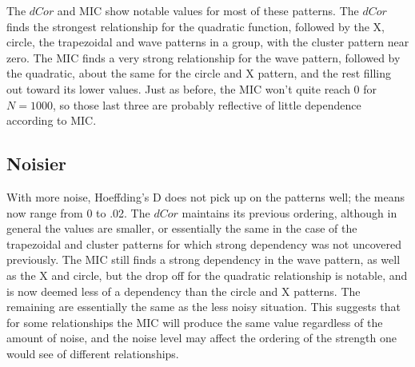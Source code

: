 \documentclass[english,nohyper,titlepage]{tufte-handout}\usepackage{graphicx, color}
\begin{document}
The $dCor$ and MIC show notable values for most of these patterns.  The $dCor$ finds the strongest relationship for the quadratic function, followed by the X, circle, the trapezoidal and wave patterns in a group, with the cluster pattern near zero. The MIC finds a very strong relationship for the wave pattern, followed by the quadratic, about the same for the circle and X pattern, and the rest filling out toward its lower values.  Just as before, the MIC won't quite reach 0 for $N = 1000$, so those last three are probably reflective of little dependence according to MIC.


\subsection{Noisier}
With more noise, Hoeffding's D does not pick up on the patterns well; the means now range from 0 to .02. The $dCor$ maintains its previous ordering, although in general the values are smaller, or essentially the same in the case of the trapezoidal and cluster patterns for which strong dependency was not uncovered previously. The MIC still finds a strong dependency in the wave pattern, as well as the X and circle, but the drop off for the quadratic relationship is notable, and is now deemed less of a dependency than the circle and X patterns.  The remaining are essentially the same as the less noisy situation.  This suggests that for some relationships the MIC will produce the same value regardless of the amount of noise, and the noise level may affect the ordering of the strength one would see of different relationships.



\end{document}
